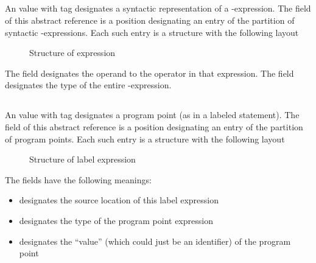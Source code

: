 


\subsection{}
\label{sec:ifc:ExprSort:Alignof}

An  value with tag  designates a syntactic representation
of a -expression.
The  field of this abstract reference is a position designating an entry of the partition
of syntactic -expressions.  Each such entry is a structure with the following layout
%
\begin{figure}[H]
	\centering
	\caption{Structure of  expression}
	\label{fig:ifc:ExprSort:Alignof}
\end{figure}

The  field designates the operand to the  operator in that expression.
The  field designates the type of the entire -expression.




\subsection{}
\label{sec:ifc:ExprSort:Label}

An  value with tag  designates a program point (as in a labeled statement).
The  field of this abstract reference is a position designating an entry of the partition
of program points.  Each such entry is a structure with the following layout
%
\begin{figure}[H]
	\centering
	\caption{Structure of label expression}
	\label{fig:ifc:ExprSort:Label}
\end{figure}
%
The fields have the following meanings:
\begin{itemize}
	\item {} designates the source location of this label expression
	\item {} designates the type of the program point expression
	\item {} designates the ``value'' (which could just be an identifier) of the program point
\end{itemize}

